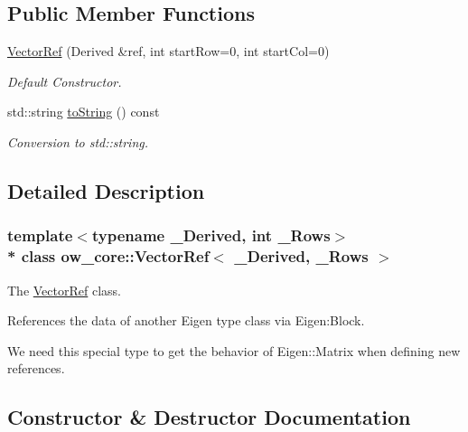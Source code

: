 \subsection*{Public Member Functions}
\begin{DoxyCompactItemize}
\item 
\hyperlink{classow__core_1_1VectorRef_add9b005be63c7346b39ddf869e591b4b}{Vector\+Ref} (Derived \&ref, int start\+Row=0, int start\+Col=0)
\begin{DoxyCompactList}\small\item\em Default Constructor. \end{DoxyCompactList}\item 
std\+::string \hyperlink{classow__core_1_1VectorRef_a8801753aee0b11331a4613f5d3391afc}{to\+String} () const \hypertarget{classow__core_1_1VectorRef_a8801753aee0b11331a4613f5d3391afc}{}\label{classow__core_1_1VectorRef_a8801753aee0b11331a4613f5d3391afc}

\begin{DoxyCompactList}\small\item\em Conversion to std\+::string. \end{DoxyCompactList}\end{DoxyCompactItemize}


\subsection{Detailed Description}
\subsubsection*{template$<$typename \+\_\+\+Derived, int \+\_\+\+Rows$>$\\*
class ow\+\_\+core\+::\+Vector\+Ref$<$ \+\_\+\+Derived, \+\_\+\+Rows $>$}

The \hyperlink{classow__core_1_1VectorRef}{Vector\+Ref} class. 

References the data of another Eigen type class via Eigen\+:Block.

We need this special type to get the behavior of Eigen\+::\+Matrix when defining new references. 

\subsection{Constructor \& Destructor Documentation}
